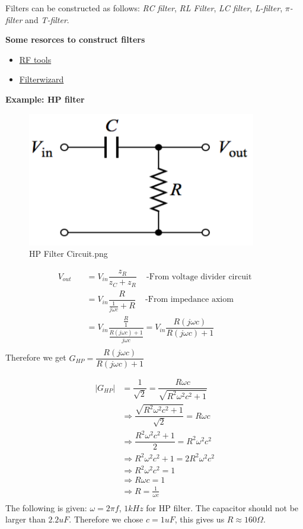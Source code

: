 Filters can be constructed as follows: \newline
\textit{RC filter}, \textit{RL Filter}, \textit{LC filter}, 
\textit{L-filter}, \textit{$\pi$-filter} and \textit{T-filter}.

\newpage
\textbf{Some resorces to construct filters}
\begin{itemize}
    \item \href{https://rf-tools.com/lc-filter/}{RF tools}
    \item \href{https://tools.analog.com/en/filterwizard/}{Filterwizard}
\end{itemize}

\textbf{Example: HP filter}
\begin{figure}[h]
    \centering
    \includegraphics[width=10cm]{image/HP-filter_circuit.png}
    \caption{HP Filter Circuit.png}
\end{figure}
\begin{align*}
    V_{out} &\quad = V_{in}\dfrac{z_R}{z_C+z_R} \;\;\; 
           \text{ -From voltage divider circuit} \\
           &\quad = V_{in}\dfrac{R}{\frac{1}{j\omega c}+R} \;\;\; \text{ -From impedance axiom} \\
           &\quad = V_{in}\dfrac{\frac{R}{1}}{\frac{R(j\omega c)+1}{j\omega c}} 
           = V_{in}\dfrac{R(j\omega c)}{R(j\omega c)+1}  \\
\end{align*}
Therefore we get $G_{HP}=\dfrac{R(j\omega c)}{R(j\omega c)+1}$

\begin{align*}
|G_{HP}| &=\dfrac{1}{\sqrt{2}}=\dfrac{R\omega c}{\sqrt{R^2\omega^2c^2+1}} \\
         &\Rightarrow \dfrac{\sqrt{R^2\omega^2c^2+1}}{\sqrt{2}}=R\omega c \\
         &\Rightarrow \dfrac{R^2\omega^2c^2+1}{2}=R^2\omega^2c^2 \\
         &\Rightarrow R^2\omega^2c^2+1=2R^2\omega^2c^2 \\
         &\Rightarrow R^2\omega^2c^2=1 \\
         &\Rightarrow R\omega c=1 \\
         &\Rightarrow R=\frac{1}{\omega c} \\
\end{align*}
The following is given: $\omega=2\pi f$, $1kHz$ for HP filter.
The capacitor should not be larger than $2.2uF$.
Therefore we chose $c=1uF$, this gives us $R\approx 160\Omega$.


